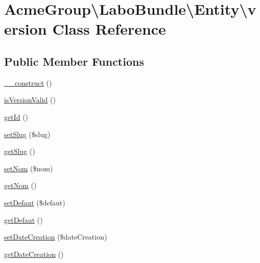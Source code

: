 \hypertarget{class_acme_group_1_1_labo_bundle_1_1_entity_1_1version}{\section{Acme\+Group\textbackslash{}Labo\+Bundle\textbackslash{}Entity\textbackslash{}version Class Reference}
\label{class_acme_group_1_1_labo_bundle_1_1_entity_1_1version}
}
\subsection*{Public Member Functions}
\begin{DoxyCompactItemize}
\item 
\hyperlink{class_acme_group_1_1_labo_bundle_1_1_entity_1_1version_abab9d82b6dc7546a00143fd5f3d86c20}{\+\_\+\+\_\+construct} ()
\item 
\hyperlink{class_acme_group_1_1_labo_bundle_1_1_entity_1_1version_ac0a55057ea03b6c4dd7fbb16a532e9be}{is\+Version\+Valid} ()
\item 
\hyperlink{class_acme_group_1_1_labo_bundle_1_1_entity_1_1version_ae8002b36d4a6cd685706b548b1b99fb6}{get\+Id} ()
\item 
\hyperlink{class_acme_group_1_1_labo_bundle_1_1_entity_1_1version_a7b534e5a90ee4148e6d1b977e5ed009a}{set\+Slug} (\$slug)
\item 
\hyperlink{class_acme_group_1_1_labo_bundle_1_1_entity_1_1version_a1a32432b325fdef0b6516d0a5452fe2e}{get\+Slug} ()
\item 
\hyperlink{class_acme_group_1_1_labo_bundle_1_1_entity_1_1version_a3bb43f3753f56ef6c632e48b599c7035}{set\+Nom} (\$nom)
\item 
\hyperlink{class_acme_group_1_1_labo_bundle_1_1_entity_1_1version_a5e50eda006df40ebf600748a9a5dc957}{get\+Nom} ()
\item 
\hyperlink{class_acme_group_1_1_labo_bundle_1_1_entity_1_1version_acccec1b2f88cb5fc11d3525179b9f180}{set\+Defaut} (\$defaut)
\item 
\hyperlink{class_acme_group_1_1_labo_bundle_1_1_entity_1_1version_a9cc7308024ff1a833877ef5f6158bf01}{get\+Defaut} ()
\item 
\hyperlink{class_acme_group_1_1_labo_bundle_1_1_entity_1_1version_a2c81d0f52dc5a3905487baaf53c6508e}{set\+Date\+Creation} (\$date\+Creation)
\item 
\hyperlink{class_acme_group_1_1_labo_bundle_1_1_entity_1_1version_a5cafe9721b87893c57280e51966eebec}{get\+Date\+Creation} ()

\end{DoxyCompactItemize}
